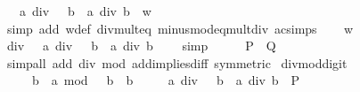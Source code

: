 \begin{isabellebody}
\ {\isachardoublequoteopen}{}\ {\isacharasterisk}{\kern0pt}\ {\isacharparenleft}{\kern0pt}a\ div\ {\isacharparenleft}{\kern0pt}{}\ {\isacharasterisk}{\kern0pt}\ b{\isacharparenright}{\kern0pt}{\isacharparenright}{\kern0pt}\ {\isacharequal}{\kern0pt}\ a\ div\ b\ {\isacharminus}{\kern0pt}\ w{\isachardoublequoteclose}\isanewline
\ \ \ \ \isamarkupfalse%
\ {\isacharparenleft}{\kern0pt}simp\ add{\isacharcolon}{\kern0pt}\ w{\isacharunderscore}{\kern0pt}def\ div{\isacharunderscore}{\kern0pt}mult{}{\isacharunderscore}{\kern0pt}eq\ minus{\isacharunderscore}{\kern0pt}mod{\isacharunderscore}{\kern0pt}eq{\isacharunderscore}{\kern0pt}mult{\isacharunderscore}{\kern0pt}div\ ac{\isacharunderscore}{\kern0pt}simps{\isacharparenright}{\kern0pt}\isanewline
\ \ \isamarkupfalse%
\ {\isacartoucheopen}w\ {\isacharequal}{\kern0pt}\ {}{\isacartoucheclose}\ \isamarkupfalse%
\ div{\isacharcolon}{\kern0pt}\ {\isachardoublequoteopen}{}\ {\isacharasterisk}{\kern0pt}\ {\isacharparenleft}{\kern0pt}a\ div\ {\isacharparenleft}{\kern0pt}{}\ {\isacharasterisk}{\kern0pt}\ b{\isacharparenright}{\kern0pt}{\isacharparenright}{\kern0pt}\ {\isacharequal}{\kern0pt}\ a\ div\ b\ {\isacharminus}{\kern0pt}\ {}{\isachardoublequoteclose}\ \isamarkupfalse%
\ simp\isanewline
\ \ \isamarkupfalse%
\ \isamarkupfalse%
\ {\isacharquery}{\kern0pt}P\ \ {\isacharquery}{\kern0pt}Q\isanewline
\ \ \ \ \isamarkupfalse%
\ {\isacharparenleft}{\kern0pt}simp{\isacharunderscore}{\kern0pt}all\ add{\isacharcolon}{\kern0pt}\ div\ mod\ add{\isacharunderscore}{\kern0pt}implies{\isacharunderscore}{\kern0pt}diff\ {\isacharbrackleft}{\kern0pt}symmetric{\isacharbrackright}{\kern0pt}{\isacharparenright}{\kern0pt}\isanewline
{}\isamarkupfalse%
%
\endisatagproof
{\isafoldproof}%
%
\isadelimproof
\isanewline
%
\endisadelimproof
\isanewline
{}\isamarkupfalse%
\ divmod{\isacharunderscore}{\kern0pt}digit{\isacharunderscore}{\kern0pt}{}{\isacharcolon}{\kern0pt}\isanewline
\ \ \ {\isachardoublequoteopen}{}\ {\isacharless}{\kern0pt}\ b{\isachardoublequoteclose}\ \ {\isachardoublequoteopen}a\ mod\ {\isacharparenleft}{\kern0pt}{}\ {\isacharasterisk}{\kern0pt}\ b{\isacharparenright}{\kern0pt}\ {\isacharless}{\kern0pt}\ b{\isachardoublequoteclose}\isanewline
\ \ \ {\isachardoublequoteopen}{}\ {\isacharasterisk}{\kern0pt}\ {\isacharparenleft}{\kern0pt}a\ div\ {\isacharparenleft}{\kern0pt}{}\ {\isacharasterisk}{\kern0pt}\ b{\isacharparenright}{\kern0pt}{\isacharparenright}{\kern0pt}\ {\isacharequal}{\kern0pt}\ a\ div\ b{\isachardoublequoteclose}\ {\isacharparenleft}{\kern0pt}\ {\isachardoublequoteopen}{\isacharquery}{\kern0pt}P{\isachardoublequoteclose}{\isacharparenright}{\kern0pt}\isanewline

\end{isabellebody}
